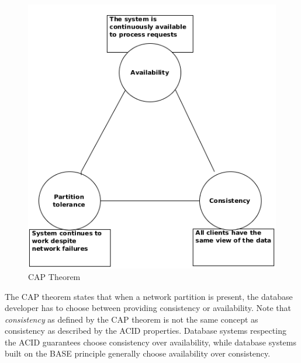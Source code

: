 \begin{figure}[H]
  \centering
  \includegraphics[width=.6\textwidth]{img/cap-theorem.png}
  \caption{CAP Theorem}
  \label{fig:cap-theorem}
\end{figure}

The CAP theorem states that when a network partition is present, the database developer has to choose between providing consistency or availability.
Note that \textit{consistency} as defined by the CAP theorem is not the same concept as consistency as described by the ACID properties.
Database systems respecting the ACID guarantees choose consistency over availability, while database systems built on the BASE principle generally choose availability over consistency.
